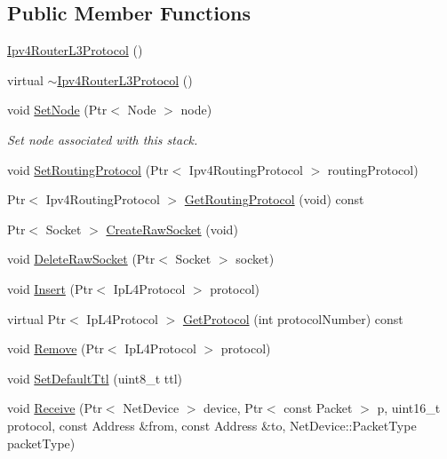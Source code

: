 \subsection*{Public Member Functions}
\begin{DoxyCompactItemize}
\item 
\hyperlink{classns3_1_1Ipv4RouterL3Protocol_a91b2d31fa02934b841bbe50f218c4981}{Ipv4\-Router\-L3\-Protocol} ()
\item 
virtual \hyperlink{classns3_1_1Ipv4RouterL3Protocol_ab3ce503154a7dc7ed8f0f78dc42f6554}{$\sim$\-Ipv4\-Router\-L3\-Protocol} ()
\item 
void \hyperlink{classns3_1_1Ipv4RouterL3Protocol_ac5411f9b064b86f0975582571cd0b6de}{Set\-Node} (Ptr$<$ Node $>$ node)
\begin{DoxyCompactList}\small\item\em Set node associated with this stack. \end{DoxyCompactList}\item 
void \hyperlink{classns3_1_1Ipv4RouterL3Protocol_adf92410e6c028eaf5f70e3c704009680}{Set\-Routing\-Protocol} (Ptr$<$ Ipv4\-Routing\-Protocol $>$ routing\-Protocol)
\item 
Ptr$<$ Ipv4\-Routing\-Protocol $>$ \hyperlink{classns3_1_1Ipv4RouterL3Protocol_a2ed4d1c2d32115e0346bebef4b9de285}{Get\-Routing\-Protocol} (void) const 
\item 
Ptr$<$ Socket $>$ \hyperlink{classns3_1_1Ipv4RouterL3Protocol_aaa5ba602f884d731b2a8b69a3827b8a6}{Create\-Raw\-Socket} (void)
\item 
void \hyperlink{classns3_1_1Ipv4RouterL3Protocol_ac15242f30514a7656194efd4736d54e5}{Delete\-Raw\-Socket} (Ptr$<$ Socket $>$ socket)
\item 
void \hyperlink{classns3_1_1Ipv4RouterL3Protocol_aadadfecb7f1ad23a55f2faabb67efc37}{Insert} (Ptr$<$ Ip\-L4\-Protocol $>$ protocol)
\item 
virtual Ptr$<$ Ip\-L4\-Protocol $>$ \hyperlink{classns3_1_1Ipv4RouterL3Protocol_a117b7e10f49fa524ac465d3d9a41d990}{Get\-Protocol} (int protocol\-Number) const 
\item 
void \hyperlink{classns3_1_1Ipv4RouterL3Protocol_a8102bc7eb7d7267472b73bb10ef13d06}{Remove} (Ptr$<$ Ip\-L4\-Protocol $>$ protocol)
\item 
void \hyperlink{classns3_1_1Ipv4RouterL3Protocol_a6c1add6164864dceeb83d5fa8bbdd59a}{Set\-Default\-Ttl} (uint8\-\_\-t ttl)
\item 
void \hyperlink{classns3_1_1Ipv4RouterL3Protocol_a30dd164d51b321d117bd06cfedd6e1f5}{Receive} (Ptr$<$ Net\-Device $>$ device, Ptr$<$ const Packet $>$ p, uint16\-\_\-t protocol, const Address \&from, const Address \&to, Net\-Device\-::\-Packet\-Type packet\-Type)

\end{DoxyCompactItemize}
